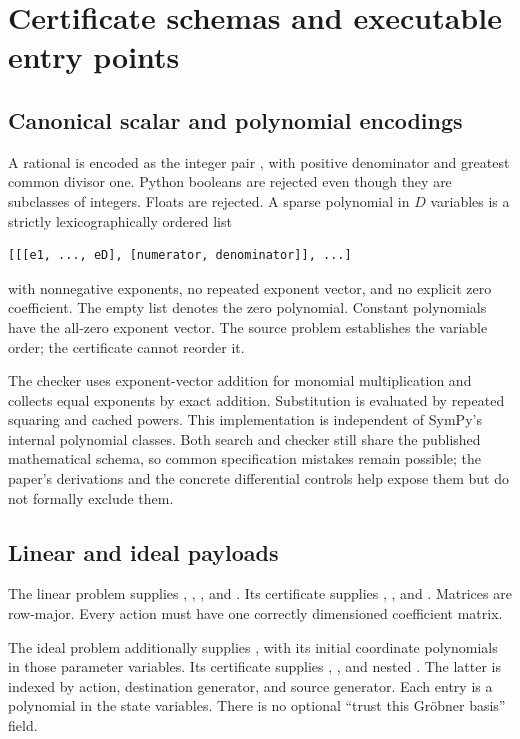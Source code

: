 \section{Certificate schemas and executable entry points}

\subsection{Canonical scalar and polynomial encodings}

A rational is encoded as the integer pair , with
positive denominator and greatest common divisor one. Python booleans are
rejected even though they are subclasses of integers. Floats are rejected.
A sparse polynomial in $D$ variables is a strictly lexicographically ordered
list
\begin{lstlisting}
[[[e1, ..., eD], [numerator, denominator]], ...]
\end{lstlisting}
with nonnegative exponents, no repeated exponent vector, and no explicit zero
coefficient. The empty list denotes the zero polynomial. Constant polynomials
have the all-zero exponent vector. The source problem establishes the variable
order; the certificate cannot reorder it.

The checker uses exponent-vector addition for monomial multiplication and
collects equal exponents by exact addition. Substitution is evaluated by repeated
squaring and cached powers. This implementation is independent of SymPy's
internal polynomial classes. Both search and checker still share the published
mathematical schema, so common specification mistakes remain possible; the
paper's derivations and the concrete differential controls help expose them but
do not formally exclude them.

\subsection{Linear and ideal payloads}

The linear problem supplies , , ,
and . Its certificate supplies ,
, and . Matrices are row-major.
Every action must have one correctly dimensioned coefficient matrix.

The ideal problem additionally supplies , with its initial
coordinate polynomials in those parameter variables. Its certificate supplies
, , and nested
. The latter is indexed by action, destination generator,
and source generator. Each entry is a polynomial in the state variables. There
is no optional ``trust this Gr\"obner basis'' field.

